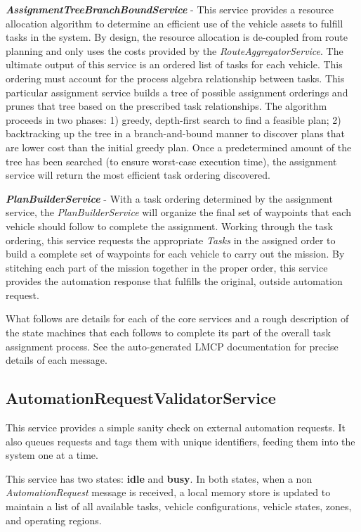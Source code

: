 \textbf{\emph{AssignmentTreeBranchBoundService}} - This service provides
a resource allocation algorithm to determine an efficient use of the
vehicle assets to fulfill tasks in the system. By design, the resource
allocation is de-coupled from route planning and only uses the costs
provided by the \emph{RouteAggregatorService}. The ultimate output of
this service is an ordered list of tasks for each vehicle. This ordering
must account for the process algebra relationship between tasks. This
particular assignment service builds a tree of possible assignment
orderings and prunes that tree based on the prescribed task
relationships. The algorithm proceeds in two phases: 1) greedy,
depth-first search to find a feasible plan; 2) backtracking up the tree
in a branch-and-bound manner to discover plans that are lower cost than
the initial greedy plan. Once a predetermined amount of the tree has
been searched (to ensure worst-case execution time), the assignment
service will return the most efficient task ordering discovered.

\textbf{\emph{PlanBuilderService}} - With a task ordering determined by
the assignment service, the \emph{PlanBuilderService} will organize the
final set of waypoints that each vehicle should follow to complete the
assignment. Working through the task ordering, this service requests the
appropriate \emph{Tasks} in the assigned order to build a complete set
of waypoints for each vehicle to carry out the mission. By stitching
each part of the mission together in the proper order, this service
provides the automation response that fulfills the original, outside
automation request.

What follows are details for each of the core services and a rough
description of the state machines that each follows to complete its part
of the overall task assignment process. See the auto-generated LMCP
documentation for precise details of each message.

\subsection{AutomationRequestValidatorService}\label{automationrequestvalidatorservice}

This service provides a simple sanity check on external automation
requests. It also queues requests and tags them with unique identifiers,
feeding them into the system one at a time.

This service has two states: \textbf{idle} and \textbf{busy}. In both
states, when a non \emph{AutomationRequest} message is received, a local
memory store is updated to maintain a list of all available tasks,
vehicle configurations, vehicle states, zones, and operating regions.

